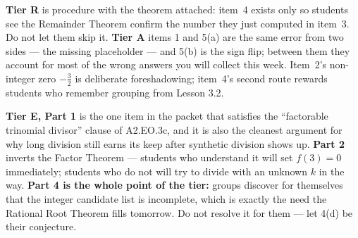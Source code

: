 \documentclass[10pt]{article}
\begin{document}
\begin{teachernote}
\textbf{Tier R} is procedure with the theorem attached: item~4 exists only so students see the
Remainder Theorem confirm the number they just computed in item~3. Do not let them skip it.
\textbf{Tier A} items 1 and 5(a) are the same error from two sides --- the missing placeholder ---
and 5(b) is the sign flip; between them they account for most of the wrong answers you will collect
this week. Item~2's non-integer zero $-\frac{3}{2}$ is deliberate foreshadowing; item~4's second
route rewards students who remember grouping from Lesson 3.2.

\vspace{3pt}
\textbf{Tier E, Part 1} is the one item in the packet that satisfies the ``factorable trinomial
divisor'' clause of A2.EO.3c, and it is also the cleanest argument for why long division still earns
its keep after synthetic division shows up. \textbf{Part 2} inverts the Factor Theorem --- students
who understand it will set $f(3)=0$ immediately; students who do not will try to divide with an
unknown $k$ in the way. \textbf{Part 4 is the whole point of the tier:} groups discover for
themselves that the integer candidate list is incomplete, which is exactly the need the Rational
Root Theorem fills tomorrow. Do not resolve it for them --- let 4(d) be their conjecture.
\end{teachernote}
\end{document}
